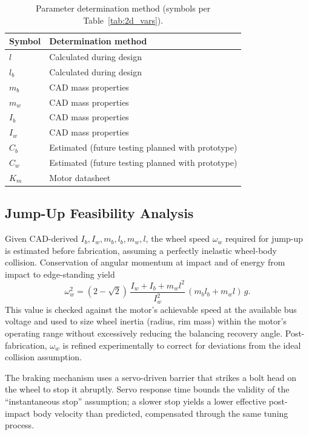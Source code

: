 \begin{table}[htbp]
\centering
\caption[Parameter determination method]{Parameter determination method (symbols per Table~\ref{tab:2d_vars}).}
\label{tab:params}
\begin{tabular}{ll}
\toprule
Symbol & Determination method \\
\midrule
$l$   & Calculated during design \\
$l_b$ & Calculated during design \\
$m_b$ & CAD mass properties \\
$m_w$ & CAD mass properties \\
$I_b$ & CAD mass properties \\
$I_w$ & CAD mass properties \\
$C_b$ & Estimated (future testing planned with prototype) \\
$C_w$ & Estimated (future testing planned with prototype) \\
$K_m$ & Motor datasheet \\
\bottomrule
\end{tabular}
\end{table}

\subsection{Jump-Up Feasibility Analysis}
\label{sec:jumpup}

Given CAD-derived $I_b, I_w, m_b, l_b, m_w, l$, the wheel speed $\omega_w$
required for jump-up is estimated before fabrication, assuming a perfectly
inelastic wheel-body collision. Conservation of angular momentum at impact and
of energy from impact to edge-standing yield
\begin{equation}
\omega_w^2 = (2-\sqrt2)\,\frac{I_w+I_b+m_wl^2}{I_w^2}\,(m_bl_b+m_wl)\,g.
\end{equation}
This value is checked against the motor's achievable speed at the available
bus voltage and used to size wheel inertia (radius, rim mass) within the
motor's operating range without excessively reducing the balancing recovery
angle. Post-fabrication, $\omega_w$ is refined experimentally to correct for
deviations from the ideal collision assumption.

The braking mechanism uses a servo-driven barrier that strikes a bolt head on
the wheel to stop it abruptly. Servo response time bounds the validity of the
``instantaneous stop'' assumption; a slower stop yields a lower effective
post-impact body velocity than predicted, compensated through the same tuning
process.

